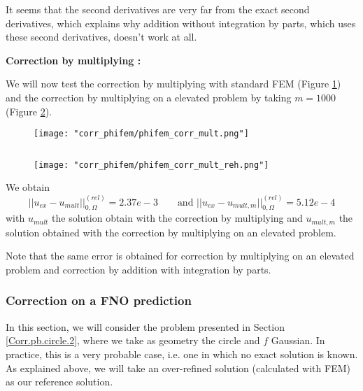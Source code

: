 It seems that the second derivatives are very far from the exact second derivatives, which explains why addition without integration by parts, which uses these second derivatives, doesn't work at all.

\textbf{Correction by multiplying :}

We will now test the correction by multiplying with standard FEM (Figure \ref{corr_phifem_phifem_corr_mult}) and the correction by multiplying on a elevated problem by taking $m=1000$ (Figure \ref{corr_phifem_phifem_corr_mult_reh}).

\begin{minipage}{0.48\linewidth}
	\begin{figure}[H]
		\centering
		\texttt{[image: "corr\_phifem/phifem\_corr\_mult.png"]}
		\label{corr_phifem_phifem_corr_mult}
	\end{figure} 
\end{minipage} $\qquad$
\begin{minipage}{0.48\linewidth}
	\begin{figure}[H]
		\centering
		\texttt{[image: "corr\_phifem/phifem\_corr\_mult\_reh.png"]}
		\label{corr_phifem_phifem_corr_mult_reh}
	\end{figure} 
\end{minipage}

We obtain
\begin{equation*}
	||u_{ex}-u_{mult}||_{0,\Omega}^{(rel)}=2.37e-3 \qquad \text{and } ||u_{ex}-u_{mult,m}||_{0,\Omega}^{(rel)}=5.12e-4
\end{equation*}
with $u_{mult}$ the solution obtain with the correction by multiplying and $u_{mult,m}$ the solution obtained with the correction by multiplying on an elevated problem.

\begin{Rem}
	Note that the same error is obtained for correction by multiplying on an elevated problem and correction by addition with integration by parts.
\end{Rem}

\subsubsection{Correction on a FNO prediction} \label{Corr.results.FNO}

In this section, we will consider the problem presented in Section \ref{Corr.pb.circle.2}, where we take as geometry the circle and $f$ Gaussian. In practice, this is a very probable case, i.e. one in which no exact solution is known. As explained above, we will take an over-refined solution (calculated with FEM) as our reference solution. 

